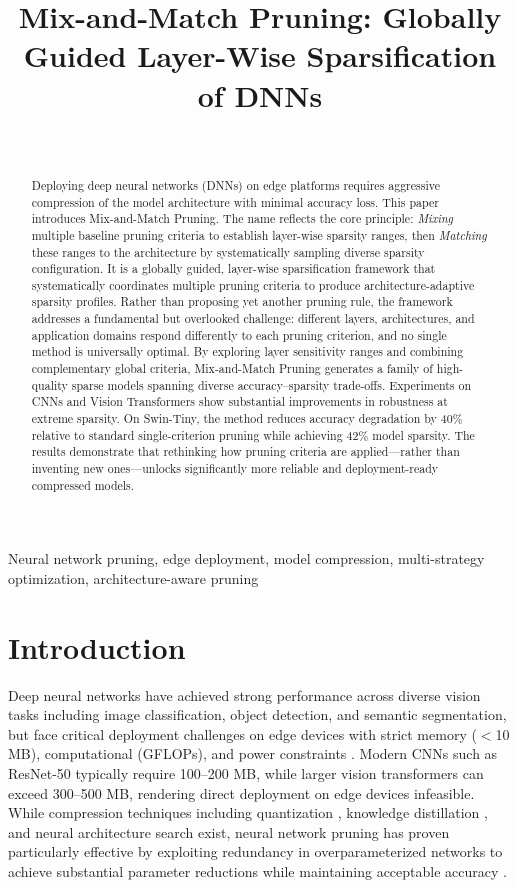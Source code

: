 \documentclass[11pt, conference]{IEEEtran}
\title{Mix-and-Match Pruning: Globally Guided Layer-Wise Sparsification of DNNs}
\author{
\IEEEauthorblockN{Danial Monachan$^{1}$,
Mahdi Taheri$^{1,2}$,
Samira Nazari$^{1}$,
Christian Herglotz$^{1}$}\\
\IEEEauthorblockA{$^{1}$Brandenburg University of Technology, Cottbus, Germany}
\IEEEauthorblockA{$^{2}$Tallinn University of Technology, Tallinn, Estonia}
}
\begin{document}
\maketitle

\begin{abstract}
Deploying deep neural networks (DNNs) on edge platforms requires aggressive compression of the model architecture with minimal accuracy loss. This paper introduces Mix-and-Match Pruning. The name reflects the
core principle: \textit{Mixing} multiple baseline pruning criteria
to establish layer-wise sparsity ranges, then \textit{Matching}
these ranges to the architecture by systematically sampling diverse sparsity configuration. It is a globally guided, layer-wise sparsification framework that systematically coordinates multiple pruning criteria to produce architecture-adaptive sparsity profiles. Rather than proposing yet another pruning rule, the framework addresses a fundamental but overlooked challenge: different layers, architectures, and application domains respond differently to each pruning criterion, and no single method is universally optimal. By exploring layer sensitivity ranges and combining complementary global criteria, Mix-and-Match Pruning generates a family of high-quality sparse models spanning diverse accuracy–sparsity trade-offs. Experiments on CNNs and Vision Transformers show substantial improvements in robustness at extreme sparsity. On Swin-Tiny, the method reduces accuracy degradation by 40\% relative to standard single-criterion pruning while achieving 42\% model sparsity. The results demonstrate that rethinking how pruning criteria are applied—rather than inventing new ones—unlocks significantly more reliable and deployment-ready compressed models.
\end{abstract}

\begin{IEEEkeywords}
Neural network pruning, edge deployment, model compression, multi-strategy optimization, architecture-aware pruning
\end{IEEEkeywords}

\FloatBarrier
\section{Introduction}

Deep neural networks have achieved strong performance across diverse vision tasks including image classification, object detection, and semantic segmentation, but face critical deployment challenges on edge devices with strict memory ($<$10 MB), computational (GFLOPs), and power constraints \cite{chavan2024edgeai, promwad2024compression}. Modern CNNs such as ResNet-50 typically require 100--200 MB, while larger vision transformers can exceed 300--500 MB, rendering direct deployment on edge devices infeasible. While compression techniques including quantization \cite{jacob2018quantization}, knowledge distillation \cite{hinton2015distilling}, and neural architecture search \cite{zoph2017neural} exist, neural network pruning has proven particularly effective by exploiting redundancy in overparameterized networks to achieve substantial parameter reductions while maintaining acceptable accuracy \cite{liu2024memory, zhang2024recap}.
\end{document}
